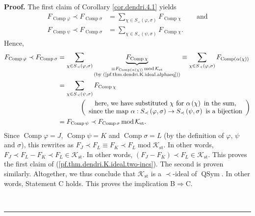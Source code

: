 \documentclass[numbers=enddot,12pt,final,onecolumn,notitlepage]{scrartcl}%
\theoremstyle{definition}
\newenvironment{proof}[1][Proof]{\noindent\textbf{#1.} }{\ \rule{0.5em}{0.5em}}
\newenvironment{verlong}{}{}
\let\sumnonlimits\sum
\renewcommand{\sum}{\sumnonlimits\limits}
\begin{document}
\begin{verlong}
\begin{proof}
The first claim of Corollary \ref{cor.dendri.4.1} yields%
\begin{align*}
F_{\operatorname*{Comp}\varphi}\left.  \prec\right.  F_{\operatorname*{Comp}%
\sigma}  &  =\sum_{\chi\in S_{\prec}\left(  \varphi,\sigma\right)
}F_{\operatorname*{Comp}\chi}\ \ \ \ \ \ \ \ \ \ \text{and}\\
F_{\operatorname*{Comp}\psi}\left.  \prec\right.  F_{\operatorname*{Comp}%
\sigma}  &  =\sum_{\chi\in S_{\prec}\left(  \psi,\sigma\right)  }%
F_{\operatorname*{Comp}\chi}.
\end{align*}
Hence,%
\begin{align*}
F_{\operatorname*{Comp}\varphi}\left.  \prec\right.  F_{\operatorname*{Comp}%
\sigma}  &  =\sum_{\chi\in S_{\prec}\left(  \varphi,\sigma\right)
}\underbrace{F_{\operatorname*{Comp}\chi}}_{\substack{\equiv
F_{\operatorname*{Comp}\left(  \alpha\left(  \chi\right)  \right)
}\operatorname{mod}\mathcal{K}_{\operatorname{st}}\\\text{(by
(\ref{pf.thm.dendri.K.ideal.alphaeq}))}}}\equiv\sum_{\chi\in S_{\prec}\left(
\varphi,\sigma\right)  }F_{\operatorname*{Comp}\left(  \alpha\left(
\chi\right)  \right)  }\\
&  =\sum_{\chi\in S_{\prec}\left(  \psi,\sigma\right)  }%
F_{\operatorname*{Comp}\chi}\\
&  \ \ \ \ \ \ \ \ \ \ \left(
\begin{array}
[c]{c}%
\text{here, we have substituted }\chi\text{ for }\alpha\left(  \chi\right)
\text{ in the sum,}\\
\text{since the map }\alpha:S_{\prec}\left(  \varphi,\sigma\right)
\rightarrow S_{\prec}\left(  \psi,\sigma\right)  \text{ is a bijection}%
\end{array}
\right) \\
&  =F_{\operatorname*{Comp}\psi}\left.  \prec\right.  F_{\operatorname*{Comp}%
\sigma}\operatorname{mod}\mathcal{K}_{\operatorname{st}}.
\end{align*}
Since $\operatorname*{Comp}\varphi=J$, $\operatorname*{Comp}\psi=K$ and
$\operatorname*{Comp}\sigma=L$ (by the definition of $\varphi$, $\psi$ and
$\sigma$), this rewrites as $F_{J}\left.  \prec\right.  F_{L}\equiv
F_{K}\left.  \prec\right.  F_{L}\operatorname{mod}\mathcal{K}%
_{\operatorname{st}}$. In other words, $F_{J}\left.  \prec\right.
F_{L}-F_{K}\left.  \prec\right.  F_{L}\in\mathcal{K}_{\operatorname{st}}$. In
other words, $\left(  F_{J}-F_{K}\right)  \left.  \prec\right.  F_{L}%
\in\mathcal{K}_{\operatorname{st}}$. This proves the first claim of
(\ref{pf.thm.dendri.K.ideal.two-incs}). The second is proven similarly.
Altogether, we thus conclude that $\mathcal{K}_{\operatorname{st}}$ is a
$\left.  \prec\right.  $-ideal of $\operatorname*{QSym}$. In other words,
Statement C holds. This proves the implication B$\Longrightarrow$C.


\end{proof}
\end{verlong}
\end{document}
